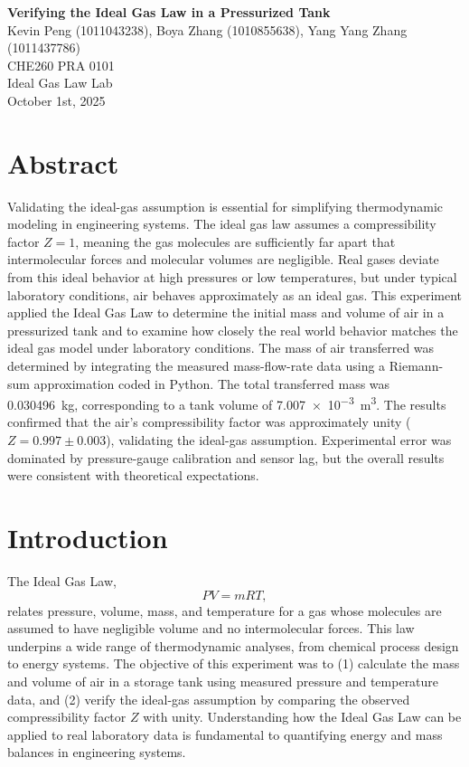 \documentclass[12pt]{article}
\begin{document}
\begin{center}
\textbf{\Large Verifying the Ideal Gas Law in a Pressurized Tank} \\[0.5em]
Kevin Peng (1011043238), Boya Zhang (1010855638), Yang Yang Zhang (1011437786)\\[0.5em]
CHE260 PRA 0101 \\
Ideal Gas Law Lab \\
October 1st, 2025 \\
\end{center}

\section*{Abstract}
Validating the ideal-gas assumption is essential for simplifying thermodynamic modeling in engineering systems.
The ideal gas law assumes a compressibility factor \( Z = 1 \), meaning the gas molecules are sufficiently far apart that intermolecular forces and molecular volumes are negligible. Real gases deviate from this ideal behavior at high pressures or low temperatures, but under typical laboratory conditions, air behaves approximately as an ideal gas.
This experiment applied the Ideal Gas Law to determine the initial mass and volume of air in a pressurized tank and to examine how closely the real world behavior matches the ideal gas model under laboratory conditions. The mass of air transferred was determined by integrating the measured mass-flow-rate data using a Riemann-sum approximation coded in Python. The total transferred mass was \SI{0.030496}{\kilogram}, corresponding to a tank volume of \SI{7.007e-3}{\metre\cubed}. The results confirmed that the air’s compressibility factor was approximately unity (\(Z = 0.997 \pm 0.003\)), validating the ideal-gas assumption. Experimental error was dominated by pressure-gauge calibration and sensor lag, but the overall results were consistent with theoretical expectations.

\section*{Introduction}
The Ideal Gas Law,
\[
PV = m R T,
\]
relates pressure, volume, mass, and temperature for a gas whose molecules are assumed to have negligible volume and no intermolecular forces. This law underpins a wide range of thermodynamic analyses, from chemical process design to energy systems. The objective of this experiment was to (1) calculate the mass and volume of air in a storage tank using measured pressure and temperature data, and (2) verify the ideal-gas assumption by comparing the observed compressibility factor \(Z\) with unity. Understanding how the Ideal Gas Law can be applied to real laboratory data is fundamental to quantifying energy and mass balances in engineering systems.
\end{document}
